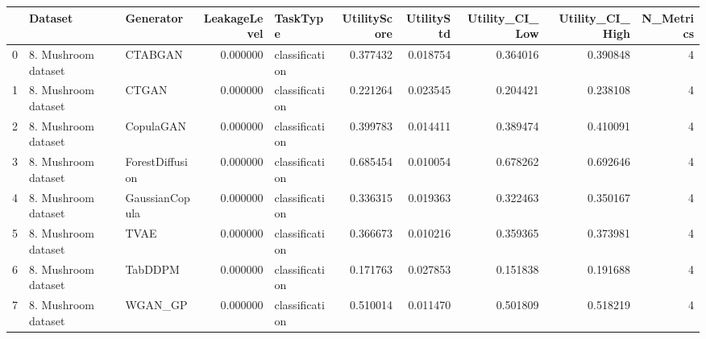 \begin{tabular}{lllrlrrrrr}
\toprule
 & Dataset & Generator & LeakageLevel & TaskType & UtilityScore & UtilityStd & Utility_CI_Low & Utility_CI_High & N_Metrics \\
\midrule
0 & 8. Mushroom dataset & CTABGAN & 0.000000 & classification & 0.377432 & 0.018754 & 0.364016 & 0.390848 & 4 \\
1 & 8. Mushroom dataset & CTGAN & 0.000000 & classification & 0.221264 & 0.023545 & 0.204421 & 0.238108 & 4 \\
2 & 8. Mushroom dataset & CopulaGAN & 0.000000 & classification & 0.399783 & 0.014411 & 0.389474 & 0.410091 & 4 \\
3 & 8. Mushroom dataset & ForestDiffusion & 0.000000 & classification & 0.685454 & 0.010054 & 0.678262 & 0.692646 & 4 \\
4 & 8. Mushroom dataset & GaussianCopula & 0.000000 & classification & 0.336315 & 0.019363 & 0.322463 & 0.350167 & 4 \\
5 & 8. Mushroom dataset & TVAE & 0.000000 & classification & 0.366673 & 0.010216 & 0.359365 & 0.373981 & 4 \\
6 & 8. Mushroom dataset & TabDDPM & 0.000000 & classification & 0.171763 & 0.027853 & 0.151838 & 0.191688 & 4 \\
7 & 8. Mushroom dataset & WGAN_GP & 0.000000 & classification & 0.510014 & 0.011470 & 0.501809 & 0.518219 & 4 \\
\bottomrule
\end{tabular}
